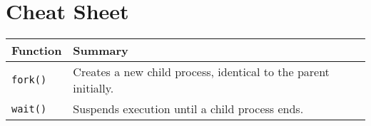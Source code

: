 \documentclass[openany,12pt]{book}
\newcommand{\code}[1]{\texttt{#1}}
\begin{document}
\part{Cheat Sheet}
\begin{longtable}{|l|p{11cm}|}
  \hline
  \textbf{Function} & \textbf{Summary}                                                \\
  \hline
  \code{fork()}     & Creates a new child process, identical to the parent initially. \\
  \code{wait()}     & Suspends execution until a child process ends.                  \\
  \hline
\end{longtable}
\end{document}
